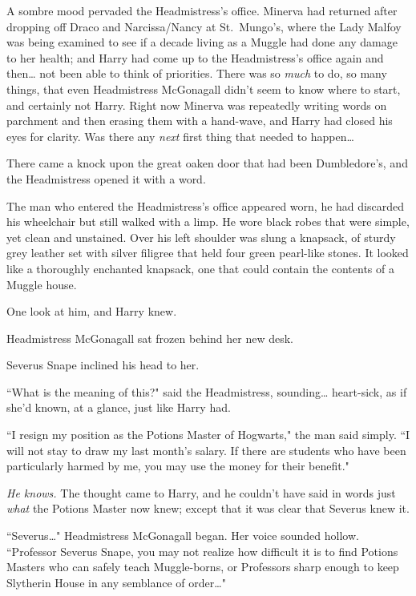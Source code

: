 
\lettrine{A}{} sombre mood pervaded the Headmistress's office. Minerva had returned after dropping off Draco and Narcissa/Nancy at St.~Mungo's, where the Lady Malfoy was being examined to see if a decade living as a Muggle had done any damage to her health; and Harry had come up to the Headmistress's office again and then{\ldots} not been able to think of priorities. There was so \emph{much} to do, so many things, that even Headmistress McGonagall didn't seem to know where to start, and certainly not Harry. Right now Minerva was repeatedly writing words on parchment and then erasing them with a hand-wave, and Harry had closed his eyes for clarity. Was there any \emph{next} first thing that needed to happen{\ldots}

There came a knock upon the great oaken door that had been Dumbledore's, and the Headmistress opened it with a word.

The man who entered the Headmistress's office appeared worn, he had discarded his wheelchair but still walked with a limp. He wore black robes that were simple, yet clean and unstained. Over his left shoulder was slung a knapsack, of sturdy grey leather set with silver filigree that held four green pearl-like stones. It looked like a thoroughly enchanted knapsack, one that could contain the contents of a Muggle house.

One look at him, and Harry knew.

Headmistress McGonagall sat frozen behind her new desk.

Severus Snape inclined his head to her.

``What is the meaning of this?" said the Headmistress, sounding{\ldots} heart-sick, as if she'd known, at a glance, just like Harry had.

``I resign my position as the Potions Master of Hogwarts," the man said simply. ``I will not stay to draw my last month's salary. If there are students who have been particularly harmed by me, you may use the money for their benefit."

\emph{He knows.} The thought came to Harry, and he couldn't have said in words just \emph{what} the Potions Master now knew; except that it was clear that Severus knew it.

``Severus{\ldots}" Headmistress McGonagall began. Her voice sounded hollow. ``Professor Severus Snape, you may not realize how difficult it is to find Potions Masters who can safely teach Muggle-borns, or Professors sharp enough to keep Slytherin House in any semblance of order{\ldots}"

